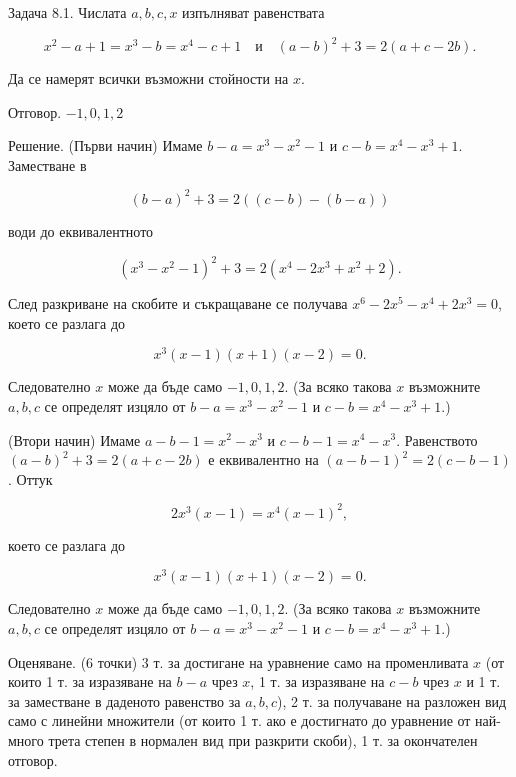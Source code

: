 
Задача 8.1. Числата $a,b,c,x$ изпълняват равенствата

$$x^2-a+1=x^3-b=x^4-c+1\quad\text{и}\quad(a-b)^2+3=2(a+c-2b).$$

Да се намерят всички възможни стойности на $x$.

Отговор. $-1,0,1,2$

Решение. (Първи начин) Имаме $b-a=x^3-x^2-1$ и $c-b=x^4-x^3+1$. Заместване в

$$(b-a)^2+3=2((c-b)-(b-a))$$

води до еквивалентното

$$(x^3-x^2-1)^2+3=2(x^4-2x^3+x^2+2).$$

След разкриване на скобите и съкращаване се получава $x^6-2x^5-x^4+2x^3=0$, което се разлага до

$$x^3(x-1)(x+1)(x-2)=0.$$

Следователно $x$ може да бъде само $-1,0,1,2$. (За всяко такова $x$ възможните $a,b,c$ се определят изцяло от $b-a=x^3-x^2-1$ и $c-b=x^4-x^3+1$.)

(Втори начин) Имаме $a-b-1=x^2-x^3$ и $c-b-1=x^4-x^3$. Равенството $(a-b)^2+3=2(a+c-2b)$ е еквивалентно на $(a-b-1)^2=2(c-b-1)$. Оттук

$$2x^3(x-1)=x^4(x-1)^2,$$

което се разлага до

$$x^3(x-1)(x+1)(x-2)=0.$$

Следователно $x$ може да бъде само $-1,0,1,2$. (За всяко такова $x$ възможните $a,b,c$ се определят изцяло от $b-a=x^3-x^2-1$ и $c-b=x^4-x^3+1$.)

Оценяване. (6 точки) 3 т. за достигане на уравнение само на променливата $x$ (от които 1 т. за изразяване на $b-a$ чрез $x$, 1 т. за изразяване на $c-b$ чрез $x$ и 1 т. за заместване в даденото равенство за $a,b,c$), 2 т. за получаване на разложен вид само с линейни множители (от които 1 т. ако е достигнато до уравнение от най-много трета степен в нормален вид при разкрити скоби), 1 т. за окончателен отговор.

